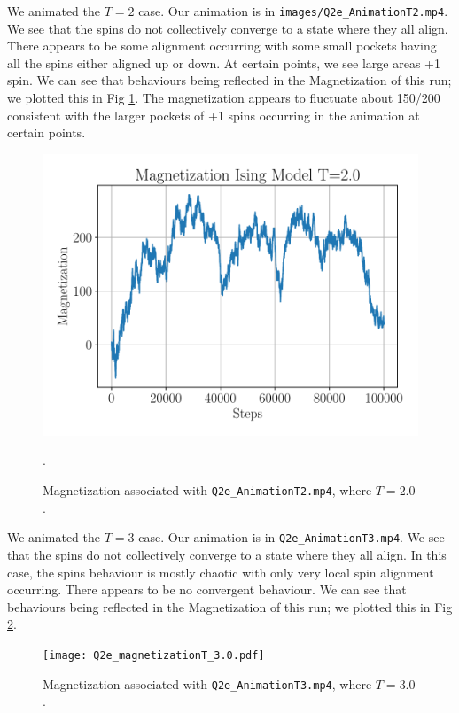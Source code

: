\documentclass{article}
\begin{document}
We animated the $T=2$ case. Our animation is in \texttt{images/Q2e\_AnimationT2.mp4}. We see that the spins do not collectively converge to a state where they all align. There appears to be some alignment occurring with some small pockets having all the spins either aligned up or down. At certain points, we see large areas +1 spin. We can see that behaviours being reflected in the Magnetization of this run; we plotted this in Fig \ref{fig:q2e_magnet_2}. The magnetization appears to fluctuate about 150/200 consistent with the larger pockets of +1 spins occurring in the animation at certain points. 
\begin{figure}[h!]
    \centerline{\includegraphics[scale=0.6]{images/Q2e_magnetizationT_2.0.pdf}}
    \caption{Magnetization associated with \texttt{Q2e\_AnimationT2.mp4}, where $T =2.0$.}.
    \label{fig:q2e_magnet_2}
\end{figure}

We animated the $T=3$ case. Our animation is in \texttt{Q2e\_AnimationT3.mp4}. We see that the spins do not collectively converge to a state where they all align. In this case, the spins behaviour is mostly chaotic with only very local spin alignment occurring. There appears to be no convergent behaviour. We can see that behaviours being reflected in the Magnetization of this run; we plotted this in Fig \ref{fig:q2e_magnet_3}. 
\begin{figure}[h!]
    \centerline{\texttt{[image: Q2e\_magnetizationT\_3.0.pdf]}}
    \caption{Magnetization associated with \texttt{Q2e\_AnimationT3.mp4}, where $T =3.0$.}
    \label{fig:q2e_magnet_3}
\end{figure}
\newpage
\hfill
\newpage
\end{document}
